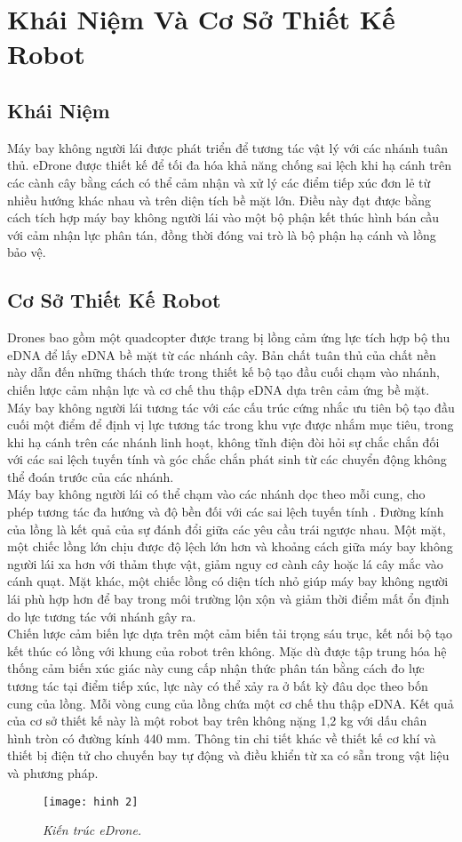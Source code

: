 \documentclass[12pt,a4paper]{article}
\begin{document}
\section{Khái Niệm Và Cơ Sở Thiết Kế Robot}
\subsection{Khái Niệm}
Máy bay không người lái được phát triển để tương tác vật lý với các nhánh tuân thủ. eDrone được thiết kế để tối đa hóa khả năng chống sai lệch khi hạ cánh trên các cành cây bằng cách có thể cảm nhận và xử lý các điểm tiếp xúc đơn lẻ từ nhiều hướng khác nhau và trên diện tích bề mặt lớn. Điều này đạt được bằng cách tích hợp máy bay không người lái vào một bộ phận kết thúc hình bán cầu với cảm nhận lực phân tán, đồng thời đóng vai trò là bộ phận hạ cánh và lồng bảo vệ. 
\subsection{Cơ Sở Thiết Kế Robot}
Drones bao gồm một quadcopter được trang bị lồng cảm ứng lực tích hợp bộ thu eDNA để lấy eDNA bề mặt từ các nhánh cây. Bản chất tuân thủ của chất nền này dẫn đến những thách thức trong thiết kế bộ tạo đầu cuối chạm vào nhánh, chiến lược cảm nhận lực và cơ chế thu thập eDNA dựa trên cảm ứng bề mặt. Máy bay không người lái tương tác với các cấu trúc cứng nhắc ưu tiên bộ tạo đầu cuối một điểm để định vị lực tương tác trong khu vực được nhắm mục tiêu, trong khi hạ cánh trên các nhánh linh hoạt, không tĩnh điện đòi hỏi sự chắc chắn đối với các sai lệch tuyến tính và góc chắc chắn phát sinh từ các chuyển động không thể đoán trước của các nhánh.\\
\linebreak
Máy bay không người lái có thể chạm vào các nhánh dọc theo mỗi cung, cho phép tương tác đa hướng và độ bền đối với các sai lệch tuyến tính . Đường kính của lồng là kết quả của sự đánh đổi giữa các yêu cầu trái ngược nhau. Một mặt, một chiếc lồng lớn chịu được độ lệch lớn hơn và khoảng cách giữa máy bay không người lái xa hơn với thảm thực vật, giảm nguy cơ cành cây hoặc lá cây mắc vào cánh quạt. Mặt khác, một chiếc lồng có diện tích nhỏ giúp máy bay không người lái phù hợp hơn để bay trong môi trường lộn xộn và giảm thời điểm mất ổn định do lực tương tác với nhánh gây ra.\\
\linebreak
Chiến lược cảm biến lực dựa trên một cảm biến tải trọng sáu trục, kết nối bộ tạo kết thúc có lồng với khung của robot trên không. Mặc dù được tập trung hóa hệ thống cảm biến xúc giác này cung cấp nhận thức phân tán bằng cách đo lực tương tác tại điểm tiếp xúc, lực này có thể xảy ra ở bất kỳ đâu dọc theo bốn cung của lồng. Mỗi vòng cung của lồng chứa một cơ chế thu thập eDNA. Kết quả của cơ sở thiết kế này là một robot bay trên không nặng 1,2 kg với dấu chân hình tròn có đường kính 440 mm. Thông tin chi tiết khác về thiết kế cơ khí và thiết bị điện tử cho chuyến bay tự động và điều khiển từ xa có sẵn trong vật liệu và phương pháp.\\
\begin{figure}
    \centering
    \texttt{[image: hinh 2]}
    \caption{\textit{Kiến trúc eDrone.}}
    \label{fig2}
\end{figure}
\end{document}
